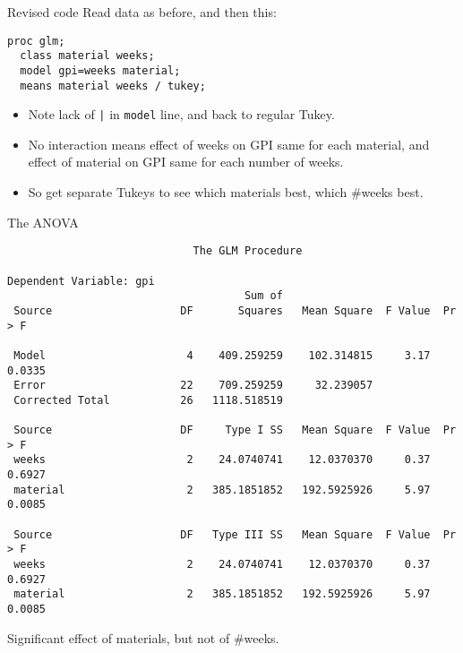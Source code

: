 \documentclass[pdf]{prosper}
\begin{document}
\begin{slide}{Revised code}
Read data as before, and then this:

\begin{verbatim}
proc glm;
  class material weeks;
  model gpi=weeks material;
  means material weeks / tukey;
\end{verbatim}

\begin{itemize}
\item 
Note lack of \verb-|- in \verb-model- line, and back to regular Tukey.
\item No interaction means effect of weeks on GPI same for each material, and effect of material on GPI same for each number of weeks.
\item So get separate Tukeys to see which materials best, which \#weeks best.
\end{itemize}
  
\end{slide}

\begin{slide}{The ANOVA}

{\scriptsize
\begin{verbatim}
                             The GLM Procedure
 
Dependent Variable: gpi   
                                     Sum of
 Source                    DF       Squares   Mean Square  F Value  Pr > F

 Model                      4    409.259259    102.314815     3.17  0.0335
 Error                     22    709.259259     32.239057                 
 Corrected Total           26   1118.518519                               

 Source                    DF     Type I SS   Mean Square  F Value  Pr > F
 weeks                      2    24.0740741    12.0370370     0.37  0.6927
 material                   2   385.1851852   192.5925926     5.97  0.0085

 Source                    DF   Type III SS   Mean Square  F Value  Pr > F
 weeks                      2    24.0740741    12.0370370     0.37  0.6927
 material                   2   385.1851852   192.5925926     5.97  0.0085

\end{verbatim}
}

Significant effect of materials, but not of \#weeks.
  
\end{slide}
\end{document}
